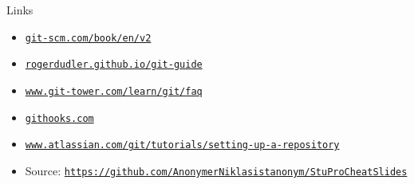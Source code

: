 \documentclass[10pt]{beamer}
\newcommand{\urlCustom}[1]{\href{https://#1}{\textcolor{greyCustom}{\texttt{#1}}}}
\begin{document}
\begin{frame}{Links}
	\begin{itemize}
		\item\urlCustom{git-scm.com/book/en/v2}
		\item\urlCustom{rogerdudler.github.io/git-guide}
		\item\urlCustom{www.git-tower.com/learn/git/faq}
		\item\urlCustom{githooks.com}
		\item\urlCustom{www.atlassian.com/git/tutorials/setting-up-a-repository}
	\end{itemize}
	\begin{center}\doclicenseThis\end{center}
    \begin{itemize}
        \item Source: \urlCustom{https://github.com/AnonymerNiklasistanonym/StuProCheatSlides}
    \end{itemize}
\end{frame}
\end{document}
